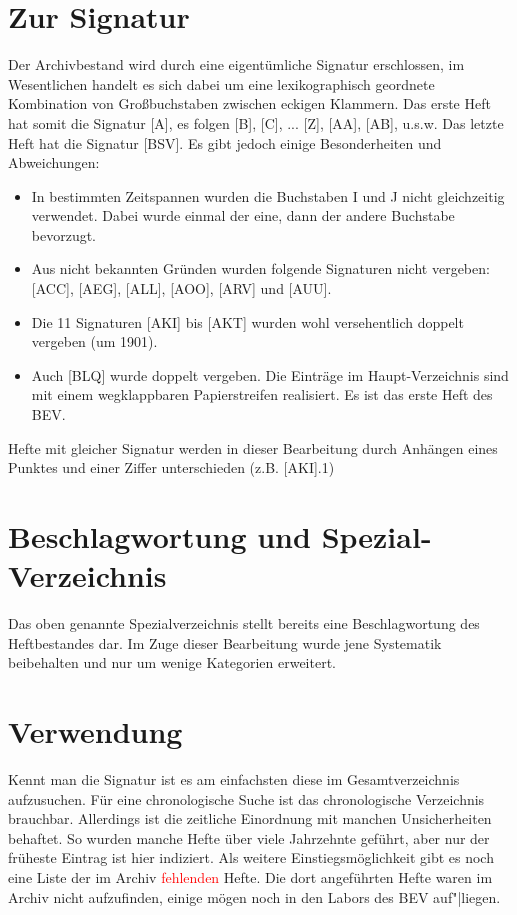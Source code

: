 \documentclass[a4paper]{scrbook}
\begin{document}
\section{Zur Signatur}

Der Archivbestand wird durch eine eigentümliche Signatur erschlossen, im Wesentlichen handelt es sich dabei um eine lexikographisch geordnete Kombination von Großbuchstaben zwischen eckigen Klammern. Das erste Heft hat somit die Signatur [A], es folgen [B], [C], ... [Z], [AA], [AB], u.s.w. Das letzte Heft hat die Signatur [BSV]. Es gibt jedoch einige Besonderheiten und Abweichungen:

\begin{itemize}
\item In bestimmten Zeitspannen wurden die Buchstaben I und J nicht gleichzeitig verwendet. Dabei wurde einmal der eine, dann der andere Buchstabe bevorzugt.
\item Aus nicht bekannten Gründen wurden folgende Signaturen nicht vergeben: [ACC], [AEG], [ALL], [AOO], [ARV] und [AUU].
\item Die 11 Signaturen [AKI] bis [AKT] wurden wohl versehentlich doppelt vergeben (um 1901).
\item Auch [BLQ] wurde doppelt vergeben. Die Einträge im Haupt-Verzeichnis sind mit einem wegklappbaren Papierstreifen realisiert. Es ist das erste Heft des BEV.
\end{itemize}
Hefte mit gleicher Signatur werden in dieser Bearbeitung durch Anhängen eines Punktes und einer Ziffer unterschieden (z.B. [AKI].1)

\section{Beschlagwortung und Spezial-Verzeichnis}

Das oben genannte \glqq{}Spezialverzeichnis\grqq{} stellt bereits eine Beschlagwortung des Heftbestandes dar. Im Zuge dieser Bearbeitung wurde jene Systematik beibehalten und nur um wenige Kategorien erweitert.

\section{Verwendung}

Kennt man die Signatur ist es am einfachsten diese im Gesamtverzeichnis aufzusuchen. Für eine chronologische Suche ist das chronologische Verzeichnis brauchbar. Allerdings ist die zeitliche Einordnung mit manchen Unsicherheiten behaftet. So wurden manche Hefte über viele Jahrzehnte geführt, aber nur der früheste Eintrag ist hier indiziert. Als weitere Einstiegsmöglichkeit gibt es noch eine Liste der im Archiv \textcolor{red}{fehlenden} Hefte. Die dort angeführten Hefte waren im Archiv nicht aufzufinden, einige mögen noch in den Labors des BEV auf"|liegen.
  
\end{document}
